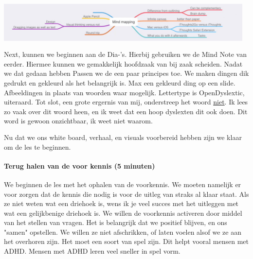                      \begin{center}
                        \includegraphics[width=35em]{Eindopdracht-Tygo-van-den-Hurk-1705709/Resources/Images/Mind-Note.jpg}
                    \end{center}
                    
                    \bigskip

                    \noindent Next, kunnen we beginnen aan de Dia-'s. Hierbij gebruiken we de Mind Note van eerder. Hiermee kunnen we gemakkelijk hoofdzaak van bij zaak scheiden. Nadat we dat gedaan hebben Passen we de een paar principes toe. We maken dingen dik gedrukt en gekleurd als het belangrijk is. Max een gekleurd ding op een slide. Afbeeldingen in plaats van woorden waar mogelijk. Lettertype is OpenDyslextic, uiteraard. Tot slot, een grote ergernis van mij, onderstreep het woord \underline{niet}. Ik lees zo vaak over dit woord heen, en ik weet dat een hoop dyslexten dit ook doen. Dit word is gewoon onzichtbaar, ik weet niet waarom.

                    \bigskip

                    \noindent Nu dat we ons white board, verhaal, en visuals voorbereid hebben zijn we klaar om de les te beginnen.
                    
                \paragraph{Terug halen van de voor kennis (5 minuten)}
                    We beginnen de les met het ophalen van de voorkennis. We moeten namelijk er voor zorgen dat de kennis die nodig is voor de uitleg van straks al klaar staat. Als ze niet weten wat een driehoek is, wens ik je veel succes met het uitleggen met wat een gelijkbenige driehoek is. We willen de voorkennis activeren door middel van het stellen van vragen. Het is belangrijk dat we positief blijven, en ons "samen" opstellen\cite{samen-boven-leads-to-better-results}. We willen ze niet afschrikken, of laten voelen alsof we ze aan het overhoren zijn. Het moet een soort van spel zijn. Dit helpt vooral mensen met ADHD. Mensen met ADHD leren veel sneller in spel vorm.\cite{ADHD-en-games}

